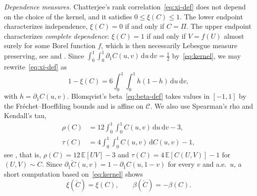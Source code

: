 \documentclass[twocolumn,a4paper]{article}
\numberwithin{equation}{section}
\theoremstyle{remark}
\newcommand{\CC}{\mathcal{C}}
\newcommand{\1}{\mathbf{1}}
\newcommand{\de}{\,\mathrm{d}}
\begin{document}
\emph{Dependence measures.}
Chatterjee's rank correlation~\eqref{eq:xi-def} does not depend on the choice of the kernel, and it satisfies \(0\le\xi(C)\le1\).
The lower endpoint characterizes independence, \(\xi(C)=0\) if and only if \(C=\Pi\).
The upper endpoint characterizes \emph{complete dependence}: \(\xi(C)=1\) if and only if \(V=f(U)\) almost surely for some Borel function \(f\), which is then necessarily Lebesgue measure preserving, see \cite[Thm.~1.1]{chatterjee2020} and \cite{dette2013copula}.
Since \(\int_0^1\!\int_0^1\partial_1C(u,v)\de u\de v=\tfrac12\) by~\eqref{eq:kernel}, we may rewrite~\eqref{eq:xi-def} as
\begin{equation}\label{eq:xi-deficit}
1-\xi(C)=6\int_0^1\!\!\int_0^1h(1-h)\de u\de v,
\end{equation}
with \(h=\partial_1C(u,v)\).
Blomqvist's beta~\eqref{eq:beta-def} takes values in \([-1,1]\) by the Fr\'echet--Hoeffding bounds and is affine on \(\CC\).
We also use Spearman's rho and Kendall's tau,
\begin{align*}
\rho(C)&=12\int_0^1\!\!\int_0^1C(u,v)\de u\de v-3,\\
\tau(C)&=4\int_0^1\!\!\int_0^1C(u,v)\de C(u,v)-1,
\end{align*}
see \cite[Sec.~5.1]{nelsen2006introduction}, that is, \(\rho(C)=12\,\mathbb E[UV]-3\) and \(\tau(C)=4\,\mathbb E[C(U,V)]-1\) for \((U,V)\sim C\).
Since \(\partial_1\check C(u,v)=1-\partial_1C(u,1-v)\) for every \(v\) and a.e.\ \(u\), a short computation based on~\eqref{eq:kernel} shows
\begin{equation}\label{eq:flip}
\xi(\check C)=\xi(C),\qquad\beta(\check C)=-\beta(C).
\end{equation}
\end{document}
